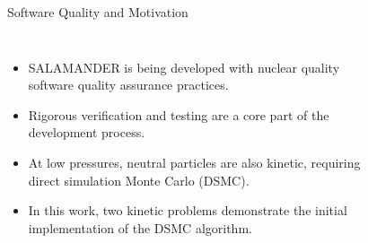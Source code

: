 \begin{frame}{Software Quality and Motivation}
  \vspace{0.5cm}
  \begin{columns}
    \begin{itemize}
        \item SALAMANDER is being developed with nuclear quality software quality assurance practices.
        \item Rigorous verification and testing are a core part of the development process.
        \item At low pressures, neutral particles are also kinetic, requiring direct simulation Monte Carlo (DSMC)\cite{bird1994molecular}.
        \item In this work, two kinetic problems demonstrate the initial implementation of the DSMC algorithm.
    \end{itemize}
    \begin{figure}
    \end{figure}
  \end{columns}
\end{frame}

